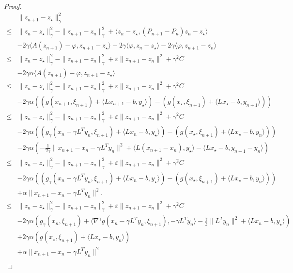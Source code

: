 \documentclass{article}
\newcommand{\1}{\mathbbm 1}
\newcommand{\ps}[1]{\langle #1 \rangle}
\theoremstyle{definition}
\begin{document}
\begin{proof}
\begin{align*}
&\|z_{n+1} - z_\star\|_\gamma^2 \\
\leq &\|z_{n} - z_\star\|_\gamma^2 - \|z_{n+1} - z_{n}\|_\gamma^2 + \ps{z_n - z_\star,(P_{n+1} - P_n)z_n - z_\star}\\
& -2\gamma \ps{A(z_{n+1}) - \varphi,z_{n+1} - z_\star} -2\gamma \ps{\varphi,z_{n} - z_\star} -2\gamma \ps{\varphi,z_{n+1} - z_n}\\
\leq &\|z_{n} - z_\star\|_\gamma^2 - \|z_{n+1} - z_{n}\|_\gamma^2 +  \varepsilon \|z_{n+1} - z_{n}\|^2 + \gamma^2 C\\
& -2\gamma \alpha \ps{A(z_{n+1}) - \varphi,z_{n+1} - z_\star} \\
\leq &\|z_{n} - z_\star\|_\gamma^2 - \|z_{n+1} - z_{n}\|_\gamma^2 +  \varepsilon \|z_{n+1} - z_{n}\|^2 + \gamma^2 C\\
& -2\gamma\alpha \left(( g(x_{n+1},\xi_{n+1}) + \ps{L x_{n+1} - b,y_\star} ) - ( g(x_\star,\xi_{n+1}) + \ps{L x_\star - b,y_{n+1}} )\right)\\
\leq &\|z_{n} - z_\star\|_\gamma^2 - \|z_{n+1} - z_{n}\|_\gamma^2 +  \varepsilon \|z_{n+1} - z_{n}\|^2 + \gamma^2 C\\
& -2\gamma\alpha \left(( g_\gamma(x_{n} - \gamma L^T y_{n},\xi_{n+1}) + \ps{L x_{n}-b,y_\star} ) - ( g(x_\star,\xi_{n+1}) + \ps{L x_\star-b,y_{n}} )\right)\\
& -2\gamma\alpha \left(-\frac{1}{2\gamma}\|x_{n+1} - x_n - \gamma L^T y_n\|^2 + \ps{L (x_{n+1} - x_n),y_\star} - \ps{L x_\star - b,y_{n+1} - y_n}\right)\\
\leq &\|z_{n} - z_\star\|_\gamma^2 - \|z_{n+1} - z_{n}\|_\gamma^2 + \varepsilon \|z_{n+1} - z_{n}\|^2 + \gamma^2 C \\
& -2\gamma\alpha \left(( g_\gamma(x_{n} - \gamma L^T y_{n},\xi_{n+1}) + \ps{L x_{n}-b,y_\star} ) - ( g(x_\star,\xi_{n+1}) + \ps{L x_\star-b,y_{n}} )\right)\\
& + \alpha\|x_{n+1} - x_n - \gamma L^T y_n\|^2.\\
\leq &\|z_{n} - z_\star\|_\gamma^2 - \|z_{n+1} - z_{n}\|_\gamma^2 + \varepsilon \|z_{n+1} - z_{n}\|^2 + \gamma^2 C \\
& -2\gamma\alpha \left( g_\gamma(x_{n},\xi_{n+1}) + \ps{\nabla^\gamma g(x_n-\gamma L^T y_n,\xi_{n+1}), -\gamma L^T y_n} - \frac{\gamma}{2}\|L^T y_n\|^2 + \ps{L x_{n}-b,y_\star} \right) \\
& +2\gamma \alpha \left( g(x_\star,\xi_{n+1}) + \ps{L x_\star -b,y_{n}} \right)\\
& + \alpha\|x_{n+1} - x_n - \gamma L^T y_n\|^2\\

\end{align*}
\end{proof}
\end{document}
